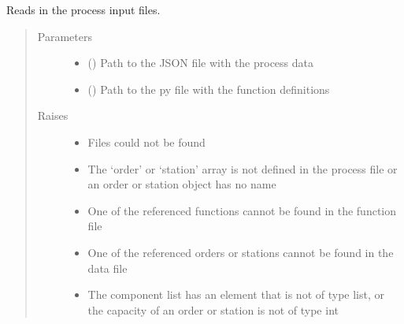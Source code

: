 \documentclass[letterpaper,10pt,english]{sphinxmanual}
\begin{document}
\begin{fulllineitems}
\begin{fulllineitems}
\label{\detokenize{source/API/api:environment.Environment.read_files}}
\sphinxAtStartPar
Reads in the process input files.
\begin{quote}\begin{description}
\item[{Parameters}] \leavevmode\begin{itemize}
\item {} 
\sphinxAtStartPar
{} () \textendash{} Path to the JSON file with the process data

\item {} 
\sphinxAtStartPar
{} () \textendash{} Path to the py file with the function definitions

\end{itemize}

\item[{Raises}] \leavevmode\begin{itemize}
\item {} 
\sphinxAtStartPar
{} \textendash{} Files could not be found

\item {} 
\sphinxAtStartPar
{} \textendash{} The ‘order’ or ‘station’ array is not defined in the process file or an order or
station object has no name

\item {} 
\sphinxAtStartPar
{} \textendash{} One of the referenced functions cannot be found in the function file

\item {} 
\sphinxAtStartPar
{} \textendash{} One of the referenced orders or stations cannot be found in the data file

\item {} 
\sphinxAtStartPar
{} \textendash{} The component list has an element that is not of type list, or the capacity of an order or
station is not of type int


\end{itemize}
\end{description}
\end{quote}
\end{fulllineitems}
\end{fulllineitems}
\end{document}
